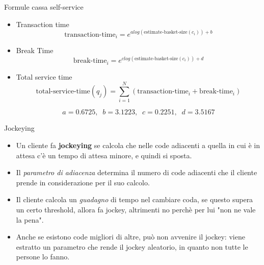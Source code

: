 \begin{frame}{Formule cassa self-service}
	\begin{itemize}
		\item Transaction time
		\begin{equation}
			\text{transaction-time}_i = e^{a log(\text{estimate-basket-size}(c_i)) + b}
		\end{equation}
		
		\item Break Time
		\begin{equation}
			\text{break-time}_i = e^{c log(\text{estimate-basket-size}(c_i)) + d}
		\end{equation}
		\item Total service time
		\begin{equation}
			\text{total-service-time}(q_j) = \sum\limits_{i=1}^N \left( \text{transaction-time}_i + \text{break-time}_i \right)
		\end{equation}
		
		\begin{equation}
			a = 0.6725, \;\; b = 3.1223, \;\; c = 0.2251, \;\; d = 3.5167
		\end{equation}
		
	\end{itemize}  
\end{frame}



\begin{frame}{Jockeying}
	\begin{itemize}
		\item Un cliente fa \textbf{jockeying} se calcola che nelle code adiacenti a quella in cui è in attesa c'è un tempo di attesa minore, e quindi si sposta.
		\item Il \textit{parametro di adiacenza} determina il numero di code adiacenti che il cliente prende in considerazione per il suo calcolo.
		\item Il cliente calcola un \textit{guadagno} di tempo nel cambiare coda, se questo supera un certo threshold, allora fa jockey, altrimenti no perchè per lui "non ne vale la pena".
		\item Anche se esistono code migliori di altre, può non avvenire il jockey: viene estratto un parametro che rende il jockey aleatorio, in quanto non tutte le persone lo fanno.
	\end{itemize}
\end{frame}

